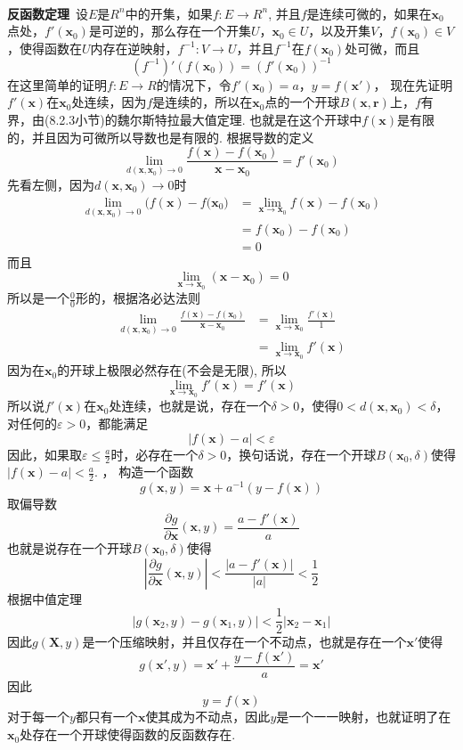 \paragraph{}
\textbf{反函数定理}\, 设$E$是$R^n$中的开集，如果$f: E\to R^n$, 并且$f$是连续可微的，如果在$\textbf{x}_0$点处，$f'(\textbf{x}_0)$是可逆的，那么存在一个开集$U$，$\textbf{x}_0 \in U$，以及开集$V$，$f(\textbf{x}_0) \in V$，使得函数在$U$内存在逆映射，$f^{-1}: V \to U$，并且$f^{-1}$在$f(\textbf{x}_0)$处可微，而且
$$
(f^{-1})' (f(\textbf{x}_0)) = (f'(\textbf{x}_0))^{-1}
$$
在这里简单的证明$f: E \to R$的情况下，令$f'(\textbf{x}_0) = a$，$y = f(\textbf{x}')$， 现在先证明$f'(\textbf{x})$在$\textbf{x}_0$处连续，因为$f$是连续的，所以在$\textbf{x}_0$点的一个开球$B(\textbf{x}, \textbf{r})$上，$f$有界，由(8.2.3小节)的魏尔斯特拉最大值定理. 也就是在这个开球中$f(\textbf{x})$是有限的，并且因为可微所以导数也是有限的.  根据导数的定义
$$
\lim_{d(\textbf{x}, \textbf{x}_0) \to 0} \frac{f(\textbf{x}) - f(\textbf{x}_0)}{\textbf{x} - \textbf{x}_0} = f'(\textbf{x}_0)
$$
先看左侧，因为$d(\textbf{x}, \textbf{x}_0) \to 0$时
\begin{align*}
\lim_{d(\textbf{x}, \textbf{x}_0) \to 0} \big(f(\textbf{x}) - f(\textbf{x}_0\big) & = \lim_{\textbf{x} \to \textbf{x}_0} f(\textbf{x}) - f(\textbf{x}_0) \\
& = f(\textbf{x}_0) - f(\textbf{x}_0) \\
& = 0
\end{align*}
而且
$$
\lim_{\textbf{x} \to \textbf{x}_0} (\textbf{x} - \textbf{x}_0) = 0
$$
所以是一个$\frac{0}{0}$形的，根据洛必达法则
\begin{align*}
\lim_{d(\textbf{x}, \textbf{x}_0) \to 0} \frac{f(\textbf{x}) - f(\textbf{x}_0)}{\textbf{x} - \textbf{x}_0}  & = \lim_{\textbf{x} \to \textbf{x}_0}  \frac{f'(\textbf{x})}{1} \\
& = \lim_{\textbf{x} \to \textbf{x}_0} f'(\textbf{x})
\end{align*}
因为在$\textbf{x}_0$的开球上极限必然存在(不会是无限), 所以
$$
\lim_{\textbf{x} \to \textbf{x}_0} f'(\textbf{x}) = f'(\textbf{x})
$$
所以说$f'(\textbf{x})$在$\textbf{x}_0$处连续，也就是说，存在一个$\delta > 0$，使得$0 < d(\textbf{x}, \textbf{x}_0) < \delta$，对任何的$\varepsilon > 0$，都能满足
$$
|f(\textbf{x}) - a | < \varepsilon
$$
因此，如果取$\varepsilon \leq \frac{a}{2}$时，必存在一个$\delta > 0$，换句话说，存在一个开球$B(\textbf{x}_0, \delta)$使得$|f(\textbf{x}) - a | < \frac{a}{2}$. ， 构造一个函数
$$
g(\textbf{x}, y) = \textbf{x} + a^{-1} (y - f(\textbf{x})) 
$$
取偏导数
$$
\frac{\partial g}{\partial \textbf{x}} (\textbf{x}, y) =  \frac{a - f'(\textbf{x})}{a}
$$
也就是说存在一个开球$B(\textbf{x}_0, \delta)$使得
$$
|\frac{\partial g}{\partial \textbf{x}} (\textbf{x}, y)| < \frac{|a - f'(\textbf{x})|}{|a|} < \frac{1}{2}
$$
根据中值定理
$$
|g(\textbf{x}_2, y) - g(\textbf{x}_1, y)| < \frac{1}{2} |\textbf{x}_2 - \textbf{x}_1|
$$
因此$g(\textbf{X}, y)$是一个压缩映射，并且仅存在一个不动点，也就是存在一个$\textbf{x}'$使得
$$
g(\textbf{x}', y) = \textbf{x}' + \frac{y - f(\textbf{x}')}{a} = \textbf{x}'
$$
因此
$$
y = f(\textbf{x})
$$
对于每一个$y$都只有一个$\textbf{x}$使其成为不动点，因此$y$是一个一一映射，也就证明了在$\textbf{x}_0$处存在一个开球使得函数的反函数存在.

